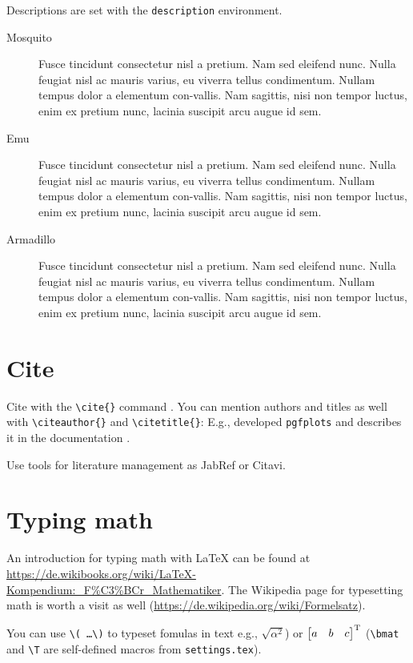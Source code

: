 Descriptions are set with the \texttt{description} environment.

\begin{description}
    \item[Mosquito] Fusce tincidunt consectetur nisl a pretium. Nam sed eleifend nunc. Nulla feugiat nisl ac mauris varius, eu viverra tellus condimentum. Nullam tempus dolor a elementum con-vallis. Nam sagittis, nisi non tempor luctus, enim ex pretium nunc, lacinia suscipit arcu augue id sem.
    \item[Emu] Fusce tincidunt consectetur nisl a pretium. Nam sed eleifend nunc. Nulla feugiat nisl ac mauris varius, eu viverra tellus condimentum. Nullam tempus dolor a elementum con-vallis. Nam sagittis, nisi non tempor luctus, enim ex pretium nunc, lacinia suscipit arcu augue id sem.
    \item[Armadillo] Fusce tincidunt consectetur nisl a pretium. Nam sed eleifend nunc. Nulla feugiat nisl ac mauris varius, eu viverra tellus condimentum. Nullam tempus dolor a elementum con-vallis. Nam sagittis, nisi non tempor luctus, enim ex pretium nunc, lacinia suscipit arcu augue id sem.
\end{description}

\section{Cite}

Cite with the \texttt{\textbackslash cite\{\}} command \cite{Cochran2005,Cubitt2013}.
You can mention authors and titles as well with \texttt{\textbackslash citeauthor\{\}} and \texttt{\textbackslash citetitle\{\}}: E.g., \citeauthor{Feuersaenger2014} developed \texttt{pgfplots} and describes it in the documentation \textit{}.

Use tools for literature management as JabRef or Citavi.

\section{Typing math}

An introduction for typing math with \LaTeX{} can be found at \url{https://de.wikibooks.org/wiki/LaTeX-Kompendium:_F%C3%BCr_Mathematiker}.
The Wikipedia page for typesetting math is worth a visit as well (\url{https://de.wikipedia.org/wiki/Formelsatz}).

You can use \texttt{\textbackslash( \ldots \textbackslash)} to typeset fomulas in text e.g., \(\sqrt{\alpha^2}\)) or \( \begin{bmatrix} a & b & c \end{bmatrix}^{\mathrm{T}} \) (\texttt{\textbackslash bmat} and \texttt{\textbackslash T} are self-defined macros from \texttt{settings.tex}).

